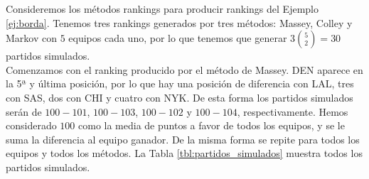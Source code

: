 \begin{ejemplo} \label{ej:partidos_simulados}
Consideremos los métodos rankings para producir rankings del Ejemplo \ref{ej:borda}. Tenemos tres rankings generados por tres métodos: Massey, Colley y Markov con $5$ equipos cada uno, por lo que tenemos que generar $3\binom{5}{2} = 30$ partidos simulados. \\

Comenzamos con el ranking producido por el método de Massey. DEN aparece en la 5ª y última posición, por lo que hay una posición de diferencia con LAL, tres con SAS, dos con CHI y cuatro con NYK. De esta forma los partidos simulados serán de $100-101$, $100-103$, $100-102$ y $100-104$, respectivamente. Hemos considerado $100$ como la media de puntos a favor de todos los equipos, y se le suma la diferencia al equipo ganador. De la misma forma se repite para todos los equipos y todos los métodos. La Tabla \ref{tbl:partidos_simulados} muestra todos los partidos simulados. \\


\end{ejemplo}
